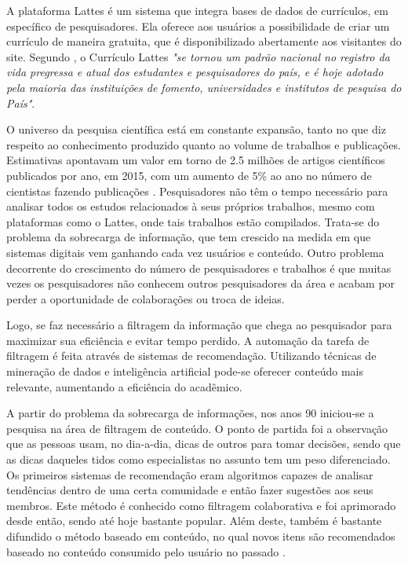 \documentclass[12pt]{article}
\begin{document}
A plataforma Lattes é um sistema que integra bases de dados de currículos, em específico de pesquisadores. 
Ela oferece aos usuários a possibilidade de criar um currículo de maneira gratuita, que é disponibilizado 
abertamente aos visitantes do site. Segundo \cite{CNPq2019lattes}, o Currículo Lattes 
\textit{"se tornou um padrão nacional no registro da vida pregressa e atual dos estudantes e 
pesquisadores do país, e é hoje adotado pela maioria das instituições de fomento, universidades e 
institutos de pesquisa do País"}.

O universo da pesquisa científica está em constante expansão, tanto no que diz respeito ao conhecimento 
produzido quanto ao volume de trabalhos e publicações. Estimativas apontavam um valor em torno de 2.5 
milhões de artigos científicos publicados por ano, em 2015, com um aumento de 5\% ao ano no número de 
cientistas fazendo publicações \cite{ware2015stm}. Pesquisadores não têm o tempo necessário para analisar 
todos os estudos relacionados à seus próprios trabalhos, mesmo com plataformas como o Lattes, onde 
tais trabalhos estão compilados. Trata-se do problema da sobrecarga de informação, que tem crescido na 
medida em que sistemas digitais vem ganhando cada vez usuários e conteúdo. Outro problema decorrente do 
crescimento do número de pesquisadores e trabalhos é que muitas vezes os pesquisadores não conhecem outros 
pesquisadores da área e acabam por perder a oportunidade de colaborações ou troca de ideias.

Logo, se faz necessário a filtragem da informação que chega ao pesquisador para maximizar sua eficiência e 
evitar tempo perdido. A automação da tarefa de filtragem é feita através de sistemas de recomendação. 
Utilizando técnicas de mineração de dados e inteligência artificial pode-se oferecer conteúdo mais relevante, 
aumentando a eficiência do acadêmico. 

A partir do problema da sobrecarga de informações, nos anos 90 iniciou-se a pesquisa na área de filtragem de conteúdo. 
O ponto de partida foi a observação que as pessoas usam, no dia-a-dia, dicas de outros para tomar decisões, sendo que 
as dicas daqueles tidos como especialistas no assunto tem um peso diferenciado. Os primeiros sistemas de recomendação 
eram algoritmos capazes de analisar tendências dentro de uma certa comunidade e então fazer sugestões aos seus membros. 
Este método é conhecido como filtragem colaborativa e foi aprimorado desde então, sendo até hoje bastante popular. Além 
deste, também é bastante difundido o método baseado em conteúdo, no qual novos itens são recomendados baseado no 
conteúdo consumido pelo usuário no passado \cite{ricci2011introduction}.
\end{document}

